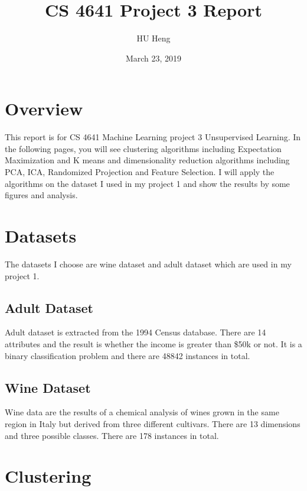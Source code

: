\documentclass[11pt]{article}
\title{CS 4641 Project 3 Report}
\author{HU Heng}
\date{March 23, 2019}
\begin{document}
\maketitle
\section{Overview}
This report is for CS 4641 Machine Learning project 3 Unsupervised Learning. In the following pages, you will see clustering algorithms including Expectation Maximization and K means and dimensionality reduction algorithms including PCA, ICA, Randomized Projection and Feature Selection. I will apply the algorithms on the dataset I used in my project 1 and show the results by some figures and analysis.\\

\section{Datasets}
The datasets I choose are wine dataset and adult dataset which are used in my project 1.
\subsection{Adult Dataset}
Adult dataset is extracted from the 1994 Census database. There are 14 attributes and the result is whether the income is greater than \$50k or not. It is a binary classification problem and there are 48842 instances in total. 
\subsection{Wine Dataset}
Wine data are the results of a chemical analysis of wines grown in the same region in Italy but derived from three different cultivars. There are 13 dimensions and three possible classes. There are 178 instances in total. 

\section{Clustering}
\end{document}
